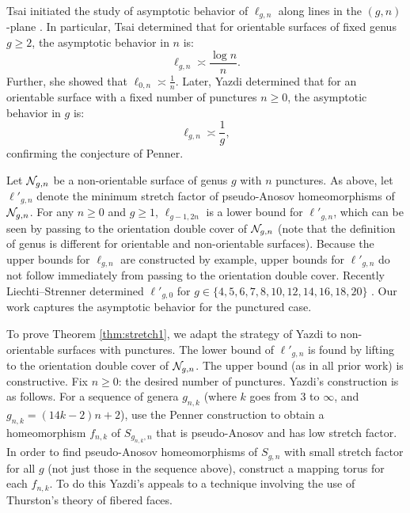 Tsai initiated the study of asymptotic behavior of $\ell_{g,n}$ along lines in the $(g,n)$-plane \cite{tsai2009asymptotic}.  In particular, Tsai determined that for orientable surfaces of fixed genus $g\geq 2$, the asymptotic behavior in $n$ is:
$$\ell_{g,n}\asymp \frac{\log n}{n}.$$
Further, she showed that $\ell_{0,n}\asymp \frac{1}{n}.$
Later, Yazdi \cite{yazdi2018pseudo} determined that for an orientable surface with a fixed number of punctures $n\geq 0$, the asymptotic behavior in $g$ is:
$$\ell_{g,n}\asymp \frac{1}{g},$$
confirming the conjecture of Penner.

Let $\mathcal{N}_{g,n}$ be a non-orientable surface of genus $g$ with $n$ punctures.  As above, let $\ell'_{g,n}$ denote the minimum stretch factor of pseudo-Anosov homeomorphisms of $\mathcal{N}_{g,n}$.  For any $n\geq 0$ and $g\geq 1$, $\ell_{g-1,2n}$ is a lower bound for $\ell'_{g,n}$, which can be seen by passing to the orientation double cover of $\mathcal{N}_{g,n}$ (note that the definition of genus is different for orientable and non-orientable surfaces).  Because the upper bounds for $\ell_{g,n}$ are constructed by example, upper bounds for $\ell'_{g,n}$ do not follow immediately from passing to the orientation double cover.  Recently Liechti--Strenner determined $\ell'_{g,0}$ for $g\in\{4,5,6,7,8,10,12,14,16,18,20\}$ \cite{LS}.  Our work captures the asymptotic behavior for the punctured case.



 To prove Theorem \ref{thm:stretch1}, we adapt the strategy of Yazdi \cite{yazdi2018pseudo} to non-orientable surfaces with punctures.  The lower bound of $\ell'_{g,n}$ is found by lifting to the orientation double cover of $\mathcal{N}_{g,n}$.  The upper bound (as in all prior work) is constructive.  Fix $n\geq 0$: the desired number of punctures.  Yazdi's construction is as follows.  For a sequence of genera $g_{n,k}$ (where $k$ goes from $3$ to $\infty$, and $g_{n,k} = (14k-2)n + 2$), use the Penner construction \cite{penner1988construction} to obtain a homeomorphism $f_{n,k}$ of $S_{g_{n,k},n}$ that is pseudo-Anosov and has low stretch factor.  In order to find pseudo-Anosov homeomorphisms of $S_{g,n}$ with small stretch factor for all $g$ (not just those in the sequence above), construct a mapping torus for each $f_{n,k}$.  To do this Yazdi's appeals to a technique involving the use of Thurston's theory of fibered faces.  

